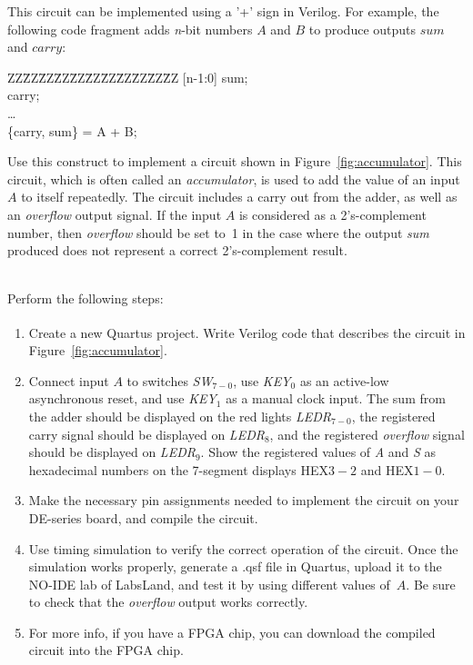 \documentclass[epsfig,10pt,fullpage]{article}
\begin{document}
This circuit can be implemented using a '+' sign in Verilog. For example, the following code 
fragment adds {\it n}-bit numbers $A$ and $B$ to produce outputs $sum$ and $carry$:

\begin{center}
\begin{minipage}[t]{12.5 cm}
\begin{tabbing}
ZZ\=ZZ\=ZZ\=ZZ\=ZZ\=ZZ\=ZZ\=ZZ\=ZZ\=ZZ\=ZZ\kill
{} [n-1:0] sum;\\
 carry;\\
\>\ldots \\
 \{carry, sum\} = A + B;\\
\end{tabbing}
\end{minipage}
\end{center}

Use this construct to implement a circuit shown in Figure~\ref{fig:accumulator}. This
circuit, which is often called an {\it accumulator}, is used to add the value of an input
$A$ to itself repeatedly. The circuit includes a carry out from the adder, as well as an
{\it overflow} output signal. If the input $A$ is considered as a 2's-complement number, 
then {\it overflow} should be set to~1
in the case where the output {\it sum} produced does not represent a correct
2's-complement result.

~\\
Perform the following steps:
\begin{enumerate}
\item Create a new Quartus\textsuperscript{\textregistered} project. Write Verilog code that describes the 
circuit in Figure~\ref{fig:accumulator}.
\item Connect input $A$ to switches {\it SW}$_{7-0}$, use {\it KEY}$_0$ as an 
active-low asynchronous reset, and use {\it KEY}$_1$ as a manual clock input. The sum 
from the adder should be displayed on the red lights {\it LEDR}$_{7-0}$, the registered 
carry signal should be displayed on {\it LEDR}$_{8}$, and the registered {\it overflow} 
signal should be displayed on {\it LEDR}$_{9}$. Show the registered values of {\it A}
and {\it S} as hexadecimal numbers on the 7-segment displays HEX$3-2$ and HEX$1-0$. 
\item Make the necessary pin assignments needed to implement the circuit on your
DE-series board, and compile the circuit.
\item Use timing simulation to verify the correct operation of the
circuit. Once the simulation works properly, generate a .qsf file in Quartus, upload it to the NO-IDE lab of LabsLand,
and test it by using different values of~$A$. Be sure to check that the {\it overflow} 
output works correctly.
\item For more info, if you have a FPGA chip, you can download the compiled circuit into the FPGA chip.
\end{enumerate}
\end{document}

